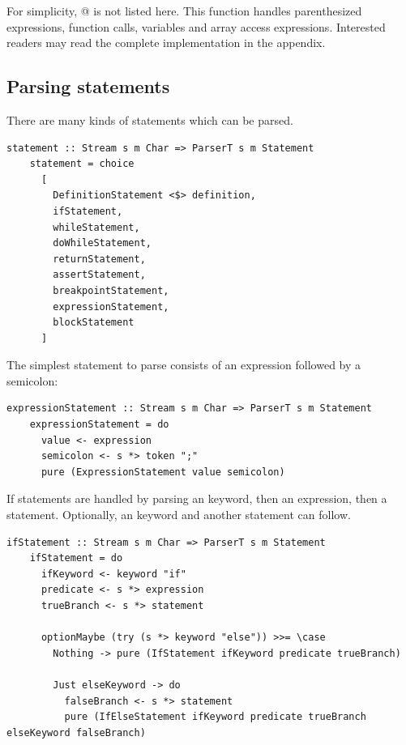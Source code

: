\documentclass[UdineBachThesis,american,11pt]{PhdThesis}
\begin{document}
  For simplicity, @ is not listed here. This function
  handles parenthesized expressions, function calls, variables and array access
  expressions. Interested readers may read the complete implementation in the
  appendix.

  \subsection{Parsing statements}

  There are many kinds of statements which can be parsed.

  \begin{lstlisting}[gobble=4,basicstyle=\ttfamily\small]
    statement :: Stream s m Char => ParserT s m Statement
    statement = choice
      [
        DefinitionStatement <$> definition,
        ifStatement,
        whileStatement,
        doWhileStatement,
        returnStatement,
        assertStatement,
        breakpointStatement,
        expressionStatement,
        blockStatement
      ]
  \end{lstlisting}

  The simplest statement to parse consists of an expression followed by a
  semicolon:

  \begin{lstlisting}[gobble=4,basicstyle=\ttfamily\small]
    expressionStatement :: Stream s m Char => ParserT s m Statement
    expressionStatement = do
      value <- expression
      semicolon <- s *> token ";"
      pure (ExpressionStatement value semicolon)
  \end{lstlisting}

  If statements are handled by parsing an \lstinline@if@ keyword, then an
  expression, then a statement. Optionally, an \lstinline@else@ keyword and
  another statement can follow.

  \begin{lstlisting}[gobble=4,basicstyle=\ttfamily\small]
    ifStatement :: Stream s m Char => ParserT s m Statement
    ifStatement = do
      ifKeyword <- keyword "if"
      predicate <- s *> expression
      trueBranch <- s *> statement

      optionMaybe (try (s *> keyword "else")) >>= \case
        Nothing -> pure (IfStatement ifKeyword predicate trueBranch)

        Just elseKeyword -> do
          falseBranch <- s *> statement
          pure (IfElseStatement ifKeyword predicate trueBranch elseKeyword falseBranch)
  \end{lstlisting}
\end{document}
